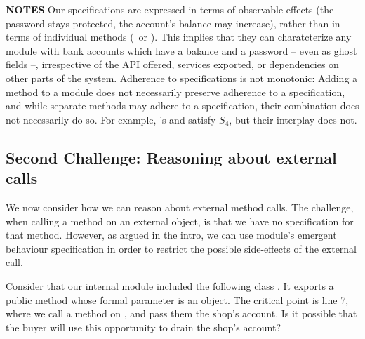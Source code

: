  
 \noindent
\textbf{NOTES} \notesep  Our specifications are expressed in terms of observable effects (\eg the password stays protected, the account's balance may increase), rather than in terms of individual methods (\eg\,  or ).
{This %
implies that they can charatcterize  any 
module with bank accounts which have a %
 balance and a password -- even as ghost fields --}, irrespective of the API offered, services  exported, or  dependencies on other parts of the system.
\notesep
{Adherence to   specifications is not monotonic:
Adding a method to a module does not necessarily preserve adherence to
a specification, and while separate methods may adhere to a  specification, their combination does
not necessarily do so. 
{For example, \ModB's   and  satisfy $S_4$, but their interplay does not.}
}

 
\subsection{Second Challenge: Reasoning about external calls}
\label{sec:how}

{We now consider how we can reason about external method calls. 
The challenge, when calling a method on an external object, is that we have no specification for that method. 
However, as argued in the intro, we can use  module's emergent behaviour  specification   in order to restrict the possible side-effects of the external call.
}

 
 
Consider that {our internal module included the following class} . It exports a public method  whose formal parameter  is an    object. 
The critical point is line 7, where we call a method on , and pass them the shop's account.
Is it possible that the buyer will use this opportunity  to drain the shop's account?
 




%
 

